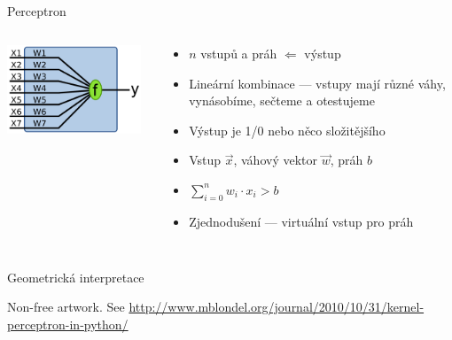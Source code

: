 \documentclass{beamer}
\begin{document}
\subsection{}
\begin{frame}{Perceptron}
\begin{columns}
\begin{column}{4cm}
\includegraphics[width=4cm]{Perceptron.pdf}
\end{column}
\begin{column}{7cm}
\begin{itemize}
\item $n$ vstupů a práh $\Leftarrow$ výstup
\item Lineární kombinace --- vstupy mají různé váhy,\\ vynásobíme, sečteme a otestujeme
\item Výstup je 1/0 nebo něco složitějšího
\pause
\item Vstup $\vec x$, váhový vektor $\vec w$, práh $b$
\item $\sum_{i=0}^n w_i \cdot x_i > b$
\item Zjednodušení --- virtuální vstup pro práh
\end{itemize}
\end{column}
\end{columns}
\end{frame}

\subsection{}
\begin{frame}{Geometrická interpretace}
\begin{center}
Non-free artwork.
See \url{http://www.mblondel.org/journal/2010/10/31/kernel-perceptron-in-python/}
\end{center}
\end{frame}
\end{document}
